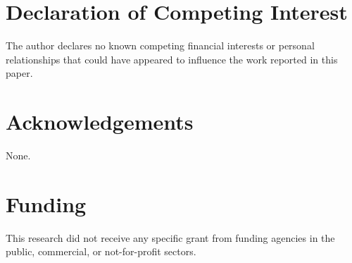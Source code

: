\documentclass[review]{elsarticle}
\begin{document}
\section*{Declaration of Competing Interest}
The author declares no known competing financial interests or personal
relationships that could have appeared to influence the work reported in this
paper.

\section*{Acknowledgements}
None.

\section*{Funding}
This research did not receive any specific grant from funding agencies in the
public, commercial, or not-for-profit sectors.
\end{document}
